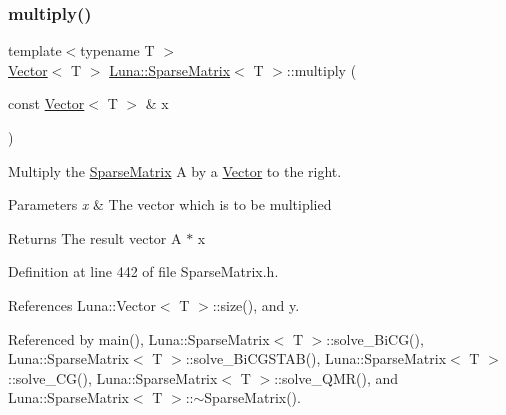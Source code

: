 \subsubsection{\texorpdfstring{multiply()}{multiply()}}
{\footnotesize\ttfamily template$<$typename T $>$ \\
\hyperlink{classLuna_1_1Vector}{Vector}$<$ T $>$ \hyperlink{classLuna_1_1SparseMatrix}{Luna\+::\+Sparse\+Matrix}$<$ T $>$\+::multiply (\begin{DoxyParamCaption}\item[{const \hyperlink{classLuna_1_1Vector}{Vector}$<$ T $>$ \&}]{x }\end{DoxyParamCaption})\hspace{0.3cm}{\ttfamily [inline]}}



Multiply the \hyperlink{classLuna_1_1SparseMatrix}{Sparse\+Matrix} A by a \hyperlink{classLuna_1_1Vector}{Vector} to the right. 


\begin{DoxyParams}{Parameters}
{\em x} & The vector which is to be multiplied \\
\hline
\end{DoxyParams}
\begin{DoxyReturn}{Returns}
The result vector A $\ast$ x 
\end{DoxyReturn}


Definition at line 442 of file Sparse\+Matrix.\+h.



References Luna\+::\+Vector$<$ T $>$\+::size(), and y.



Referenced by main(), Luna\+::\+Sparse\+Matrix$<$ T $>$\+::solve\+\_\+\+Bi\+C\+G(), Luna\+::\+Sparse\+Matrix$<$ T $>$\+::solve\+\_\+\+Bi\+C\+G\+S\+T\+A\+B(), Luna\+::\+Sparse\+Matrix$<$ T $>$\+::solve\+\_\+\+C\+G(), Luna\+::\+Sparse\+Matrix$<$ T $>$\+::solve\+\_\+\+Q\+M\+R(), and Luna\+::\+Sparse\+Matrix$<$ T $>$\+::$\sim$\+Sparse\+Matrix().


